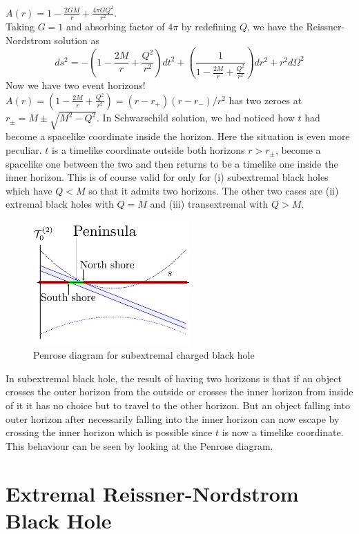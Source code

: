 ﻿\documentclass[12pt,a4paper]{article}
\begin{document}
$A(r)=1-\frac{2 G M}{r}+\frac{4 \pi G Q^{2}}{r^{2}}$.\\
Taking $G=1$ and absorbing factor of $4 \pi$ by redefining $Q$, we have the Reissner-Nordstrom solution as 
$$d s^{2}=-\left(1-\frac{2 M}{r}+\frac{Q^{2}}{r^{2}}\right) d t^{2}+\left(\frac{1}{1-\frac{2 M}{r}+\frac{Q^{2}}{r^{2}}}\right) d r^{2}+r^{2} d \Omega^{2}$$
Now we have two event horizons! $A(r)=\left(1-\frac{2 M}{r}+\frac{Q^{2}}{r^{2}}\right)=\left(r-r_{+}\right)\left(r-r_{-}\right) / r^{2}$ has two zeroes at
$r_{\pm}=M \pm \sqrt{M^{2}-Q^{2}}$. In Schwarschild solution, we had noticed how $t$ had become a spacelike coordinate inside the horizon. Here the situation is even more peculiar. $t$ is a timelike coordinate outside both horizons $r>r_{\pm}$, become a spacelike one between the two and then returns to be a timelike one inside the inner horizon. This is of course valid for only for (i) subextremal black holes which have $Q<M$ so that it admits two horizons. The other two cases are (ii) extremal black holes with $Q=M$ and (iii) transextremal with $Q>M$.
\begin{figure}[H]
  \centering
  \includegraphics[width=6cm]{7.jpg}
  \caption{Penrose diagram for subextremal charged black hole}
  \label{fig:1}
\end{figure}
In subextremal black hole, the result of having two horizons is that if an object crosses the outer horizon from the outside or crosses the inner horizon from inside of it it has no choice but to travel to the other horizon. But an object falling into outer horizon after necessarily falling into the inner horizon can now escape by crossing the inner horizon which is possible since $t$ is now a timelike coordinate. This behaviour can be seen by looking at the Penrose diagram.

\section{Extremal Reissner-Nordstrom Black Hole}
\end{document}
